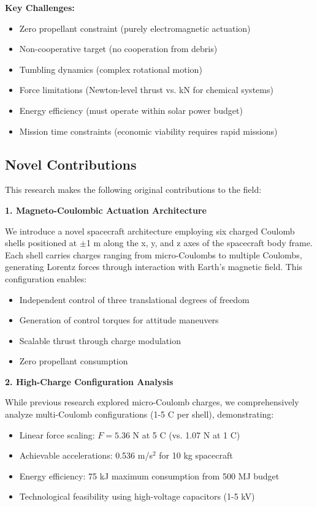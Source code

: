 \documentclass[12pt,a4paper]{article}
\begin{document}
\textbf{Key Challenges:}
\begin{itemize}
\item Zero propellant constraint (purely electromagnetic actuation)
\item Non-cooperative target (no cooperation from debris)
\item Tumbling dynamics (complex rotational motion)
\item Force limitations (Newton-level thrust vs. kN for chemical systems)
\item Energy efficiency (must operate within solar power budget)
\item Mission time constraints (economic viability requires rapid missions)
\end{itemize}

\subsection{Novel Contributions}

This research makes the following original contributions to the field:

\textbf{1. Magneto-Coulombic Actuation Architecture}

We introduce a novel spacecraft architecture employing six charged Coulomb shells positioned at $\pm$1 m along the x, y, and z axes of the spacecraft body frame. Each shell carries charges ranging from micro-Coulombs to multiple Coulombs, generating Lorentz forces through interaction with Earth's magnetic field. This configuration enables:
\begin{itemize}
\item Independent control of three translational degrees of freedom
\item Generation of control torques for attitude maneuvers
\item Scalable thrust through charge modulation
\item Zero propellant consumption
\end{itemize}

\textbf{2. High-Charge Configuration Analysis}

While previous research explored micro-Coulomb charges, we comprehensively analyze multi-Coulomb configurations (1-5 C per shell), demonstrating:
\begin{itemize}
\item Linear force scaling: $F = 5.36$ N at 5 C (vs. 1.07 N at 1 C)
\item Achievable accelerations: 0.536 m/s$^2$ for 10 kg spacecraft
\item Energy efficiency: 75 kJ maximum consumption from 500 MJ budget
\item Technological feasibility using high-voltage capacitors (1-5 kV)
\end{itemize}
\end{document}
